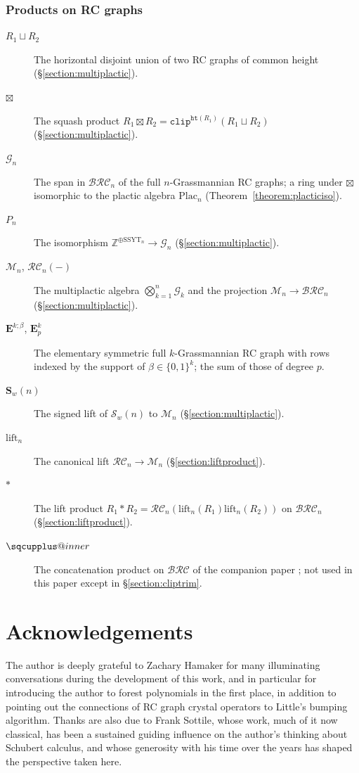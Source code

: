 \documentclass{amsart}
\makeatletter
\newcommand{\sqcupplus@inner}[2]{%
  \vcenter{\hbox{\ooalign{%
    \hfil$\m@th#1\sqcup$\hfil\cr
    \hfil\raisebox{0.15ex}{$\m@th#1\scriptscriptstyle+$}\hfil\cr
  }}}%
}
\newcommand{\sqcupplus}{\mathbin{\mathpalette\sqcupplus@inner\relax}}
\theoremstyle{definition}
\theoremstyle{remark}
\numberwithin{equation}{subsection}
\newcommand{\grass}{\mathcal{G}}
\newcommand{\plac}{\mathrm{Plac}}
\newcommand{\hr}{\mathtt{ht}}
\newcommand{\clp}{\mathtt{clip}}
\newcommand{\BRC}{\mathcal{BRC}}
\newcommand{\RC}{\mathcal{RC}}
\newcommand{\SSYT}{\mathrm{SSYT}}
\makeatother
\begin{document}
\subsubsection*{Products on RC graphs}
\begin{description}
\item[$R_1\sqcup R_2$] The horizontal disjoint union of two RC graphs of common height (\S\ref{section:multiplactic}).
\item[$\boxtimes$] The squash product $R_1\boxtimes R_2=\clp^{\hr(R_1)}(R_1\sqcup R_2)$ (\S\ref{section:multiplactic}).
\item[$\grass_n$] The span in $\BRC_n$ of the full $n$-Grassmannian RC graphs; a ring under $\boxtimes$ isomorphic to the plactic algebra $\plac_n$ (Theorem~\ref{theorem:placticiso}).
\item[$P_n$] The isomorphism $\mathbb{Z}^{\oplus\SSYT_n}\to\grass_n$ (\S\ref{section:multiplactic}).
\item[$\mathcal{M}_n$, $\RC_n(-)$] The multiplactic algebra $\bigotimes_{k=1}^n\grass_k$ and the projection $\mathcal{M}_n\to\BRC_n$ (\S\ref{section:multiplactic}).
\item[$\mathbf{E}^{k;\beta}$, $\mathbf{E}_p^k$] The elementary symmetric full $k$-Grassmannian RC graph with rows indexed by the support of $\beta\in\{0,1\}^k$; the sum of those of degree $p$.
\item[$\mathbf{S}_w(n)$] The signed lift of $\mathcal{S}_w(n)$ to $\mathcal{M}_n$ (\S\ref{section:multiplactic}).
\item[$\mathrm{lift}_n$] The canonical lift $\RC_n\to\mathcal{M}_n$ (\S\ref{section:liftproduct}).
\item[$*$] The lift product $R_1*R_2=\RC_n(\mathrm{lift}_n(R_1)\mathrm{lift}_n(R_2))$ on $\BRC_n$ (\S\ref{section:liftproduct}).
\item[$\sqcupplus$] The concatenation product on $\BRC$ of the companion paper \cite{samuelbialgebra}; not used in this paper except in \S\ref{section:cliptrim}.
\end{description}

\endgroup

\section*{Acknowledgements}

The author is deeply grateful to Zachary Hamaker for many illuminating conversations during the development of this work, and in particular for introducing the author to forest polynomials in the first place, in addition to pointing out the connections of RC graph crystal operators to  Little's bumping algorithm. Thanks are also due to Frank Sottile, whose work, much of it now classical, has been a sustained guiding influence on the author's thinking about Schubert calculus, and whose generosity with his time over the years has shaped the perspective taken here.



\end{document}
